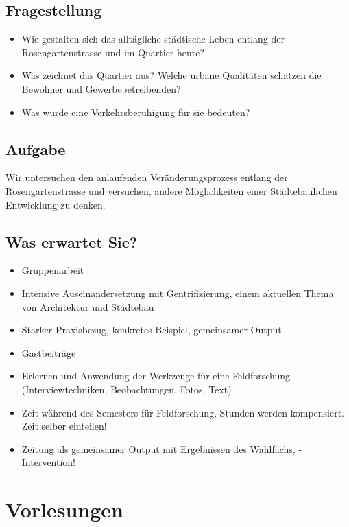 \documentclass[11pt]{article}
\begin{document}
\subsection{Fragestellung}
\label{sec-1-2}

\begin{itemize}
\item Wie gestalten sich das alltägliche städtische Leben entlang der
Rosengartenstrasse und im Quartier heute?
\item Was zeichnet das Quartier aus? Welche urbane Qualitäten schätzen die
Bewohner und Gewerbebetreibenden?
\item Was würde eine Verkehrsberuhigung für sie bedeuten?
\end{itemize}

\subsection{Aufgabe}
\label{sec-1-3}

Wir untersuchen den anlaufenden Veränderungsprozess entlang der
Rosengartenstrasse und versuchen, andere Möglichkeiten einer Städtebaulichen
Entwicklung zu denken.

\subsection{Was erwartet Sie?}
\label{sec-1-4}

\begin{itemize}
\item Gruppenarbeit
\item Intensive Auseinandersetzung mit Gentrifizierung, einem aktuellen Thema von
Architektur und Städtebau
\item Starker Praxisbezug, konkretes Beispiel, gemeinsamer Output
\item Gastbeiträge
\item Erlernen und Anwendung der Werkzeuge für eine Feldforschung
(Interviewtechniken, Beobachtungen, Fotos, Text)
\item Zeit während des Semesters für Feldforschung, Stunden werden
kompensiert. Zeit selber einteilen!
\item Zeitung als gemeinsamer Output mit Ergebnissen des Wahlfachs, -
Intervention!
\end{itemize}

\section{Vorlesungen}
\label{sec-2}
\end{document}
